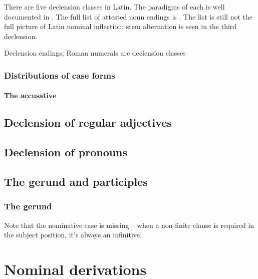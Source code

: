 \documentclass[a4paper, oneside]{report}
\newcommand*{\citepage}[1]{p.~{#1}}
\begin{document}
There are five declension classes in Latin.
The paradigms of each is well documented in \citet[\citepage{17}]{allen1903allen}.
The full list of attested noun endings is .
The list is still not the full picture of Latin nominal inflection:
stem alternation is seen in the third declension.

\begin{table}[H]
    \caption{Declension endings; Roman numerals are declension classes}
    \label{tbl:declension-ending-nouns-list}
    \centering
    
\end{table}

\subsection{Distributions of case forms}

\subsubsection{The accusative}\label{sec:accusative-distribution}

\section{Declension of regular adjectives}



\section{Declension of pronouns}

\section{The gerund and participles}\label{sec:gerund-participle-morphology}



\subsection{The gerund}\label{sec:gerund-morphology}

Note that the nominative case is missing -- 
when a non-finite clause is required in the subject position,
it's always an infinitive.

\chapter{Nominal derivations}
\end{document}
